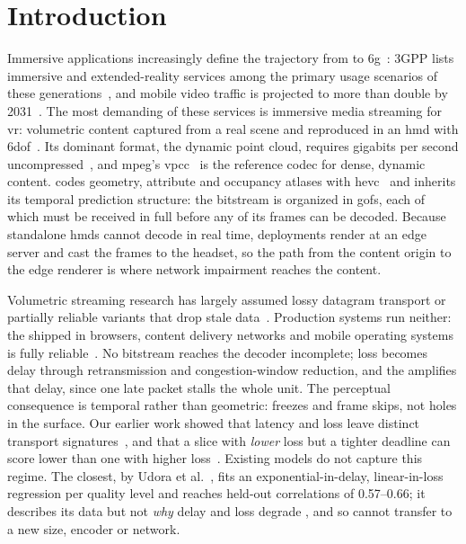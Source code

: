 \section{Introduction}
\label{sec:intro}

Immersive applications increasingly define the trajectory from \fiveg
to \gls{6g}~\cite{shen2023toward}: 3GPP lists immersive and
extended-reality services among the primary usage scenarios of these
generations~\cite{3gpp22261}, and mobile
video traffic is projected to more than double by
2031~\cite{mobility25nov}. The most demanding of these services is
immersive media streaming for \gls{vr}: volumetric content captured from
a real scene and reproduced in an \gls{hmd} with
\gls{6dof}~\cite{Immersivevideo,Viola2023}. Its dominant format, the
dynamic point cloud, requires gigabits per second
uncompressed~\cite{pcstreaming21}, and \gls{mpeg}'s
\gls{vpcc}~\cite{v3c,vpccgraziosi} is the reference codec for dense,
dynamic content. \vpcc codes geometry, attribute and occupancy atlases
with \gls{hevc}~\cite{hevc} and inherits its temporal prediction
structure: the bitstream is organized in \glspl{gof}, each of which must
be received in full before any of its frames can be decoded. Because
standalone \glspl{hmd} cannot decode \vpcc in real time, deployments
render at an edge server and cast the frames to the headset, so the
path from the content origin to the edge renderer is where network
impairment reaches the content.

Volumetric streaming research has largely assumed lossy datagram
transport or partially reliable \quic variants that drop stale
data~\cite{ravuri2023,haseeb2025}. Production systems run neither: the
\quic shipped in browsers, content delivery networks and mobile
operating systems is fully reliable~\cite{rfc9000}. No bitstream reaches
the decoder incomplete; loss becomes delay through retransmission and
congestion-window reduction, and the \gof amplifies that delay, since
one late packet stalls the whole unit. The perceptual consequence is
temporal rather than geometric: freezes and frame skips, not holes in
the surface. Our earlier work showed that latency and loss leave
distinct transport signatures~\cite{vquest2026}, and that a \vpcc slice
with \emph{lower} loss but a tighter \gof deadline can score lower
than one with higher loss~\cite{mosaic2026}. Existing \qoe models do not
capture this regime. The closest, by Udora et
al.~\cite{qoeholographic,udora2026tmm}, fits an exponential-in-delay,
linear-in-loss regression per quality level and reaches held-out
correlations of 0.57--0.66; it describes its data but not \emph{why}
delay and loss degrade \qoe, and so cannot transfer to a new \gof size,
encoder or network.

